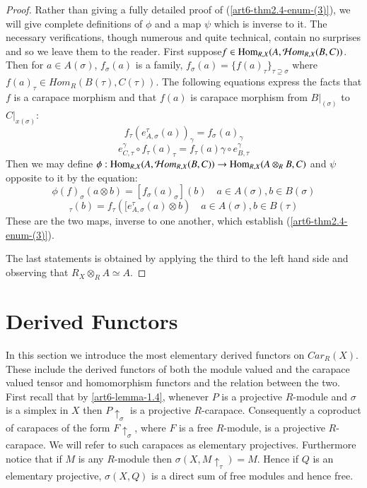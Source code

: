 \begin{proof}
Rather than giving a fully detailed proof of (\ref{art6-thm2.4-enum-(3)}), we will give complete definitions of $\phi$ and a map $\psi$ which is inverse to it. The necessary verifications, though numerous and quite technical, contain no surprises and so we leave them to the reader. First suppose\break $f \in \operatorname{Hom}_{R,X}(A, \mathcal{H} om_{R,X}(B, C))$. Then for
$a \in A(\sigma)$, $f_{\sigma}(a)$ is a family, $f_{\sigma}(a)  =\{f(a)_{\tau}\}_{\tau \supseteq \sigma}$ where
$f(a)_{\tau} \in Hom_{R}(B(\tau), C(\tau))$. The following equations express the facts that $f$ is a carapace morphism and that $f(a)$ is carapace morphism from $B|_(\sigma)$ to $C|_{x(\sigma)}$:
\begin{equation}
f_{\tau}(e_{A,\sigma}^{\tau}(a))_{\gamma} = f_{\sigma}(a)_{\gamma}\tag{5}\label{eq:proof-5}
\end{equation}
\begin{equation}
e_{C, \tau}^{\gamma} \circ f_{\tau}(a)_{\tau} = f_{\tau}(a)\gamma \circ e_{B,\tau}^{\gamma}\tag{6}\label{eq:proof-6}
\end{equation}
Then we may define $\phi : \operatorname{Hom}_{R,X}(A, \mathcal{H} om_{R,X}(B,C))\rightarrow \operatorname{Hom}_{R,X}(A \otimes_{R}B, C)$ and $\psi$ opposite to it by the equation:
\begin{equation}
\phi(f)_{\sigma}(a\otimes b) =[f_{\sigma}(a)_{\sigma}](b) \quad a\in A(\sigma), b\in B(\sigma)\tag{7}\label{eq:proof-7}
\end{equation}
\begin{equation}
[\phi (F)_{\sigma}(a)]_{\tau}(b) = f_{\tau}([e_{A, \sigma}^{\tau}(a)\otimes b) \quad a\in A(\sigma), b \in B(\tau)\tag{8}\label{eq:proof-8}
\end{equation}
These are the two maps, inverse to one another, which establish (\ref{art6-thm2.4-enum-(3)}).

The last statements is obtained by applying the third to the left hand side and observing that $R_{X}\otimes_{R}A\simeq A$.
\end{proof}

\section{Derived Functors}\label{art6-sec-3}

In this section we introduce the most elementary derived functors on $C ar_{R}(X)$. These include the derived functors of both the module valued and the carapace valued tensor and homomorphism functors and the relation between the two. First recall that by \ref{art6-lemma-1.4}, whenever $P$ is a projective $R$-module and $\sigma$ is a simplex in $X$ then $P\uparrow_{\sigma}$ is a projective $R$-carapace. Consequently a coproduct of carapaces of the form $F \uparrow_{\sigma}$, where $F$ is a free $R$-module, is a projective $R$-carapace. We will refer to such carapaces as elementary projectives. Furthermore notice that if $M$ is any $R$-module then $\sigma(X, M\uparrow_{\tau})=M$. Hence if $Q$ is an elementary projective, $\sigma(X, Q)$ is a direct sum of free modules and hence free.

